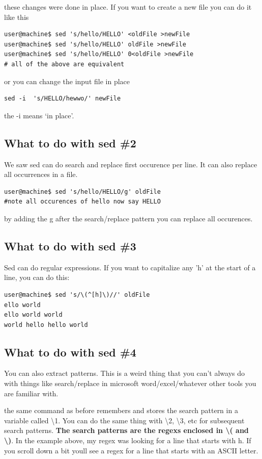 \documentclass[10pt]{article}
\begin{document}
these changes were done in place. If you want to create a new file you can do it like this

\begin{lstlisting}
user@machine$ sed 's/hello/HELLO' <oldFile >newFile
user@machine$ sed 's/hello/HELLO' oldFile >newFile
user@machine$ sed 's/hello/HELLO' 0<oldFile >newFile
# all of the above are equivalent
\end{lstlisting}

or you can change the input file in place

\begin{lstlisting}
sed -i  's/HELLO/hewwo/' newFile
\end{lstlisting}

the -i means `in place'.

\subsection{What to do with sed \#2}
We saw sed can do search and replace first occurence per line. It can also replace all occurrences in a file.

\begin{lstlisting}
user@machine$ sed 's/hello/HELLO/g' oldFile
#note all occurences of hello now say HELLO
\end{lstlisting}

by adding the g after the search/replace pattern you can replace all occurences.

\subsection{What to do with sed \#3}
Sed can do regular expressions. If you want to capitalize any 'h' at the start of a line, you can do this:

\begin{lstlisting}
user@machine$ sed 's/\(^[h]\)//' oldFile
ello world
ello world world
world hello hello world
\end{lstlisting}

\subsection{What to do with sed \#4}
You can also extract patterns. This is a weird thing that you can't always do with things like search/replace in microsoft word/excel/whatever other tools you are familiar with.

the same command as before remembers and stores the search pattern in a variable called \textbackslash1. You can do the same thing with \textbackslash2, \textbackslash3, etc for subsequent search patterns. \textbf{The search patterns are the regexs enclosed in \textbackslash( and \textbackslash)}. In the example above, my regex was looking for a line that starts with h. If you scroll down a bit youll see a regex for a line that starts with an ASCII letter.
\end{document}
